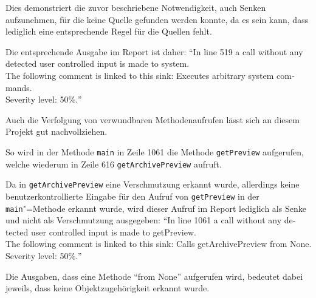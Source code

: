         Dies demonstriert die zuvor beschriebene Notwendigkeit,
        auch Senken aufzunehmen,
        für die keine Quelle gefunden werden konnte,
        da es sein kann,
        dass lediglich eine entsprechende Regel für die Quellen fehlt.

        Die entsprechende Ausgabe im Report ist daher:
        \foreignquote{english}{In line 519 a call without any detected user controlled input is made to system.\\
        The following comment is linked to this sink: Executes arbitrary system commands.\\
        Severity level: 50\%.}

        Auch die Verfolgung von verwundbaren Methodenaufrufen lässt sich an diesem Projekt gut nachvollziehen.

        So wird in der Methode
        \lstinline{main} in Zeile 1061 die Methode
        \lstinline{getPreview} aufgerufen,
        welche wiederum in Zeile 616
        \lstinline{getArchivePreview} aufruft.

        Da in
        \lstinline{getArchivePreview} eine Verschmutzung erkannt wurde,
        allerdings keine benutzerkontrollierte Eingabe für den Aufruf von
        \lstinline{getPreview} in der
        \lstinline{main}"=Methode erkannt wurde,
        wird dieser Aufruf im Report lediglich als Senke und
        nicht als Verschmutzung ausgegeben:
        \foreignquote{english}{In line 1061 a call without any detected user controlled input is made to getPreview.\\
        The following comment is linked to this sink: Calls getArchivePreview from None.\\
        Severity level: 50\%.}

        Die Ausgaben,
        dass eine Methode
        \foreignquote{english}{from None} aufgerufen wird,
        bedeutet dabei jeweils,
        dass keine Objektzugehörigkeit erkannt wurde.
